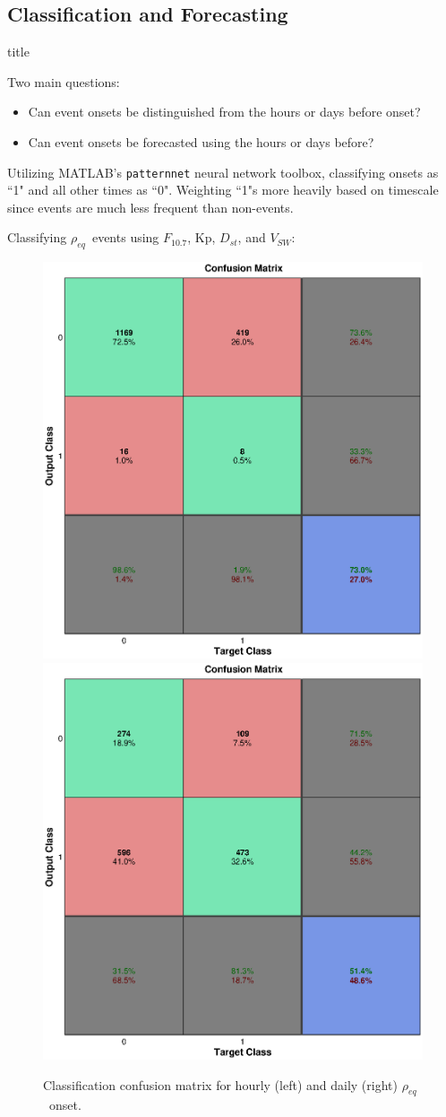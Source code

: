 \documentclass[xcolor={dvipsnames,table}]{beamer}
\newcommand{\subheader}{    		\begin{center}
  	\begin{beamercolorbox}[sep=4pt,center,shadow=true,rounded=true]{title}
  		\usebeamerfont{title}\subsecname\par%
  	\end{beamercolorbox}
  	\vfill
  	\end{center}}
\newcommand{\req}{\ensuremath{\rho_{eq}}} %
\newcommand{\dst}{\ensuremath{D_{st}}} %
\newcommand{\f}{\ensuremath{F_{10.7}}} %
\begin{document}
\subsection{Classification and Forecasting}
\begin{frame}
	\subheader
	Two main questions:
	\begin{itemize}
		\item Can event onsets be distinguished from the hours or days before onset?
		\item Can event onsets be forecasted using the hours or days before?
	\end{itemize}
	\vspace{1em}
	Utilizing MATLAB's \texttt{patternnet} neural network toolbox, classifying onsets as ``1" and all other times as ``0". Weighting ``1"s more heavily based on timescale since events are much less frequent than non-events.
\end{frame}



\begin{frame}
	Classifying \req\ events using \f, Kp, \dst, and $V_{SW}$:
	\begin{figure}[htp!]
		\centering
		\includegraphics[width=0.45\linewidth]{Figures/CH5/NNBinaryOnset-hourly.eps}
		\includegraphics[width=0.45\linewidth]{Figures/CH5/NNBinaryOnset-daily.eps}
		\caption{Classification confusion matrix for hourly (left) and daily (right) \req\ onset.}
		\label{fig:OnsetEvents}
	\end{figure}
\end{frame}
\end{document}
